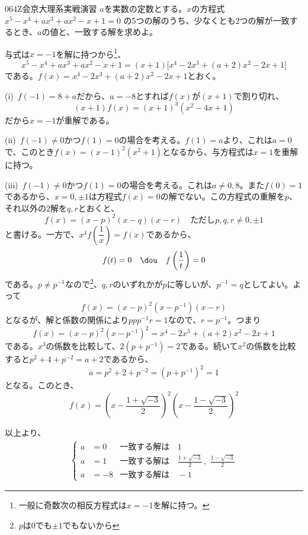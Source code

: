 \begin{thm}{064}{}{Z会京大理系実戦演習}
 $a$を実数の定数とする。$x$の方程式 $x^5-x^4+ax^3+ax^2-x+1=0$ の5つの解のうち、少なくとも2つの解が一致するとき、$a$の値と、一致する解を求めよ。
\end{thm}

与式は$x=-1$を解に持つから\footnote{一般に奇数次の相反方程式は$x=-1$を解に持つ。}、
\[ x^5-x^4+ax^3+ax^2-x+1=(x+1)\bigl[x^4-2x^3+(a+2)x^2-2x+1\bigr] \]
である。$f(x)=x^4-2x^3+(a+2)x^2-2x+1$とおく。

(i)~$f(-1)=8+a$だから、$a=-8$とすれば$f(x)$が$(x+1)$で割り切れ、
\[ (x+1)f(x)=(x+1)^3(x^2-4x+1) \]
だから$x=-1$が重解である。

(ii)~$f(-1)\neq 0$かつ$f(1)=0$の場合を考える。$f(1)=a$より、これは$a=0$で、このとき$f(x)=(x-1)^2(x^2+1)$となるから、与方程式は$x=1$を重解に持つ。

(iii)~$f(-1)\neq 0$かつ$f(1)=0$の場合を考える。これは$a\neq 0, 8$。また$f(0)=1$であるから、$x=0, \pm 1$は方程式$f(x)=0$の解でない。この方程式の重解を$p$、それ以外の2解を$q, r$とおくと、
\[ f(x)=(x-p)^2(x-q)(x-r) \quad \text{ただし$p, q, r\neq 0, \pm 1$} \]
と書ける。一方で、$x^4f\left(\dfrac{1}{x}\right)=f(x)$であるから、
\[ f(t)=0 \quad\dou\quad f\left(\frac{1}{t}\right)=0 \]
である。$p\neq p^{-1}$なので\footnote{$p$は$0$でも$\pm 1$でもないから}、$q, r$のいずれかが$p$に等しいが、$p^{-1}=q$としてよい。よって
\[ f(x)=(x-p)^2(x-p^{-1})(x-r) \]
となるが、解と係数の関係により$ppp^{-1}r=1$なので、$r=p^{-1}$。つまり
\[ f(x)=(x-p)^2(x-p^{-1})^2=x^4-2x^3+(a+2)x^2-2x+1 \]
である。$x^3$の係数を比較して、$2(p+p^{-1})=2$である。続いて$x^2$の係数を比較すると$p^2+4+p^{-2}=a+2$であるから、
\[ a=p^2+2+p^{-2}=(p+p^{-1})^2=1 \]
となる。このとき、
\[ f(x)=\left(x-\frac{1+\sqrt{-3}}{2}\right)^2\left(x-\frac{1-\sqrt{-3}}{2}\right)^2 \]

以上より、
\begin{align*}
 \left\{
 \begin{aligned}
  a&=0 & \text{一致する解は}&\, 1 \\
  a&=1 & \text{一致する解は}&\, \frac{1+\sqrt{-3}}{2}\,,\,\, \frac{1-\sqrt{-3}}{2} \\
  a&=-8 & \text{一致する解は}&\, -1
 \end{aligned}
 \right.
\end{align*}
